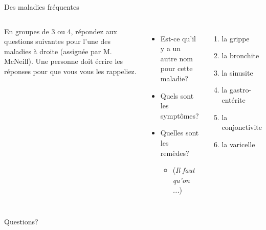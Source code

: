 \documentclass{beamer}
\begin{document}
  \begin{frame}{Des maladies fréquentes}
    \begin{columns}
      \scriptsize
        En groupes de 3 ou 4, répondez aux questions suivantes pour l'une des maladies à droite (assignée par M. McNeill).
        Une personne doit écrire les réponses pour que vous vous les rappeliez.
        \begin{itemize}
          \item Est-ce qu'il y a un autre nom pour cette maladie?
          \item Quels sont les symptômes?
          \item Quelles sont les remèdes?
          \begin{itemize}
            \scriptsize
            \item (\emph{Il faut qu'on ...})
          \end{itemize}
        \end{itemize}
        \begin{enumerate}
          \item la grippe
          \item la bronchite
          \item la sinusite
          \item la gastro-entérite
          \item la conjonctivite
          \item la varicelle
        \end{enumerate}
    \end{columns}
  \end{frame}

  \begin{frame}{}
    \begin{center}
      \Large Questions?
    \end{center}
  \end{frame}
\end{document}
